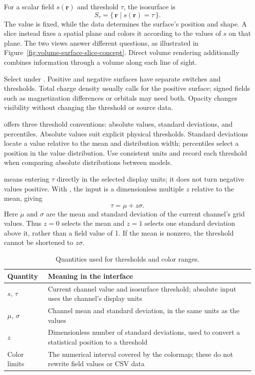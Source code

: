 For a scalar field $s(\mathbf r)$ and threshold $\tau$, the isosurface is
\begin{equation}
  S_{\tau}=\{\,\mathbf r\mid s(\mathbf r)=\tau\,\}.
  \label{eq:volume-isosurface}
\end{equation}
The value is fixed, while the data determines the surface's position and shape. A slice instead fixes a spatial plane and colors it according to the values of $s$ on that plane. The two views answer different questions, as illustrated in Figure~\ref{fig:volume-surface-slice-concept}. Direct volume rendering additionally combines information through a volume along each line of sight.



Select  under . Positive and negative surfaces have separate switches and thresholds. Total charge density usually calls for the positive surface; signed fields such as magnetization differences or orbitals may need both. Opacity changes visibility without changing the threshold or source data.

 offers three threshold conventions: absolute values, standard deviations, and percentiles. Absolute values suit explicit physical thresholds. Standard deviations locate a value relative to the mean and distribution width; percentiles select a position in the value distribution. Use consistent units and record each threshold when comparing absolute distributions between models.

 means entering $\tau$ directly in the selected display units; it does not turn negative values positive. With , the input is a dimensionless multiple $z$ relative to the mean, giving
\begin{equation}
  \tau=\mu+z\sigma.
  \label{eq:volume-sigma-threshold}
\end{equation}
Here $\mu$ and $\sigma$ are the mean and standard deviation of the current channel's grid values. Thus $z=0$ selects the mean and $z=1$ selects one standard deviation above it, rather than a field value of 1. If the mean is nonzero, the threshold cannot be shortened to $z\sigma$.

\begin{table}[htbp]
\centering
\caption{Quantities used for thresholds and color ranges.}
\begin{tabularx}{\linewidth}{lX}
\toprule
Quantity & Meaning in the interface\\
\midrule
$s$, $\tau$ & Current channel value and isosurface threshold; absolute input uses the channel's display units\\
$\mu$, $\sigma$ & Channel mean and standard deviation, in the same units as the values\\
$z$ & Dimensionless number of standard deviations, used to convert a statistical position to a threshold\\
Color limits & The numerical interval covered by the colormap; these do not rewrite field values or CSV data\\
\bottomrule
\end{tabularx}
\end{table}

